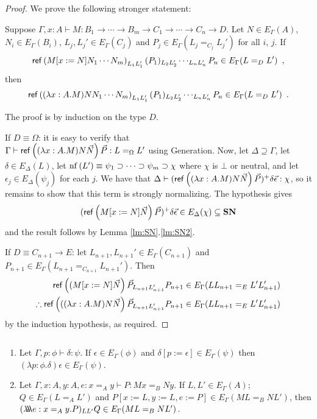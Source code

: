 \begin{proof}
We prove the following stronger statement:

Suppose $\Gamma, x : A \vdash M : B_1 \rightarrow \cdots \rightarrow B_m \rightarrow C_1 \rightarrow \cdots \rightarrow C_n \rightarrow D$.
Let $N \in E_\Gamma(A)$, $N_i \in E_\Gamma(B_i)$, $L_j, L_j' \in E_\Gamma(C_j)$ and $P_j \in E_\Gamma(L_j =_{C_j} L_j')$ for all $i$, $j$.
If $$\mathsf{ref} \left( {M[x:=N] N_1 \cdots N_m} \right)_{L_1 L_1'} (P_1)_{L_2 L_2'} \cdots_{L_n L_n'} P_n \in E_\Gamma(L =_{D} L') \enspace , $$
then $$\mathsf{ref} \left( {(\lambda x:A.M)N N_1 \cdots N_m} \right)_{L_1 L_1'} (P_1)_{L_2 L_2'} \cdots_{L_n L_n'} P_n \in E_\Gamma(L =_{D} L') \enspace . $$

The proof is by induction on the type $D$.

If $D \equiv \Omega$: it is easy to verify that \\
$\Gamma \vdash \mathsf{ref} \left( {(\lambda x:A.M)N \vec{N}} \right) \vec{P} : L =_{\Omega} L'$ using
Generation.  Now, let $\Delta \supseteq \Gamma$, let $\delta \in E_\Delta(L)$, let
$\mathrm{nf} \left( {L'} \right) \equiv \psi_1 \supset \cdots \supset \psi_m \supset \chi$ where $\chi$ is $\bot$ or neutral,
and let $\epsilon_j \in E_\Delta(\psi_j)$ for each $j$.  We have that $\Delta \vdash (\mathsf{ref} \left( {(\lambda x:A.M)N \vec{N}} \right) \vec{P})^+ \delta \vec{\epsilon} : \chi$, so it remains to show that this term is strongly normalizing.  The hypothesis gives
\[ (\mathsf{ref} \left( {M[x:=N] \vec{N}} \right) \vec{P})^+ \delta \vec{\epsilon} \in E_\Delta(\chi) \subseteq \mathbf{SN} \]
and the result follows by Lemma \ref{lm:SN}.\ref{lm:SN2}.

If $D \equiv C_{n+1} \rightarrow E$: let $L_{n+1}, L_{n+1}' \in E_\Gamma(C_{n+1})$ and $P_{n+1} \in E_{\Gamma}(L_{n+1} =_{C_{n+1}} L_{n+1}')$.  Then
\begin{align*}
\mathsf{ref} \left( {(M[x:=N] \vec{N}} \right) \vec{P}_{L_{n+1} L_{n+1}'} P_{n+1} & \in E_\Gamma(L L_{n+1} =_{E} L' L_{n+1}') \\
\therefore \mathsf{ref} \left( {((\lambda x:A.M)N \vec{N}} \right) \vec{P}_{L_{n+1} L_{n+1}'} P_{n+1} & \in E_\Gamma(L L_{n+1} =_{E} L' L_{n+1}')
\end{align*}
by the induction hypothesis, as required.
\end{proof}

\begin{lemma}
\label{lm:wte5}
$ $
\begin{enumerate}
\item
Let $\Gamma, p : \phi \vdash \delta : \psi$.  If $\epsilon \in E_\Gamma(\phi)$
and $\delta [p := \epsilon] \in E_\Gamma(\psi)$ then $(\lambda p:\phi.\delta) \epsilon \in E_\Gamma(\psi)$.
\item
Let $\Gamma, x : A, y : A, e : x =_A y \vdash P : M x =_B N y$.  If
$L, L' \in E_\Gamma(A)$; $Q \in E_\Gamma(L =_A L')$ and $P[ x := L, y := L, e
:= P ] \in E_\Gamma(M L =_B N L')$, then $(\lambda \!\! \lambda \!\! \lambda e : x =_A y . P)_{L L'} Q \in E_\Gamma(ML =_B NL')$.
\end{enumerate}
\end{lemma}

